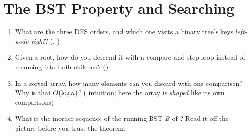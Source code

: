 \section{The BST Property and Searching}\label{sec:c05-property}

\begin{previouslybox}
\begin{enumerate}[nosep, leftmargin=1.6em]
  \item What are the three DFS orders, and which one visits a binary tree's keys
        \emph{left-node-right}? (, )
  \item Given a  root, how do you descend it with a compare-and-step loop instead
        of recursing into both children? ()
  \item In a sorted array, how many elements can you discard with one comparison? Why is that
        $O(\log n)$? ( intuition; here the array is \emph{shaped} like its own
        comparisons)
  \item What is the inorder sequence of the running BST $B$ of ? Read it off
        the picture before you trust the theorem.
\end{enumerate}
\end{previouslybox}

